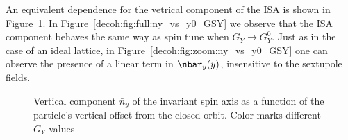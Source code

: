 An equivalent dependence for the vetrical component of the ISA is shown
in Figure~\ref{decoh:fig:ny_vs_y0_GSY}. In Figure~\ref{decoh:fig:full:ny_vs_y0_GSY} we observe
that the ISA component behaves the same way as spin tune when $G_Y \rightarrow G_Y^0$.
Just as in the case of an ideal lattice, in Figure~\ref{decoh:fig:zoom:ny_vs_y0_GSY}
one can observe the presence of a linear term in $\nbar_y(y)$, insensitive to the sextupole fields.

\begin{figure}[h!]
	\centering
	\caption{Vertical component $\bar n_y$ of the invariant spin axis as a function of the particle's
          vertical offset from the closed orbit.
          Color marks different $G_Y$ values\label{decoh:fig:ny_vs_y0_GSY}}
\end{figure}

